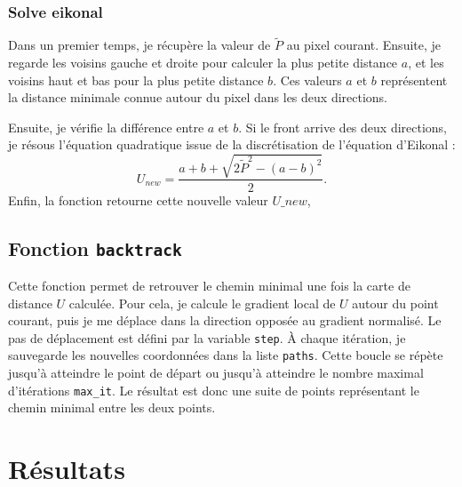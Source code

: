 \documentclass{article}
\begin{document}
\subsubsection{Solve eikonal}

Dans un premier temps, je récupère la valeur de $\tilde{P}$ au pixel courant.  
Ensuite, je regarde les voisins gauche et droite pour calculer la plus petite 
distance $a$, et les voisins haut et bas pour la plus petite distance $b$.  
Ces valeurs $a$ et $b$ représentent la distance minimale connue autour du pixel 
dans les deux directions.  

Ensuite, je vérifie la différence entre $a$ et $b$.  
Si le front arrive des deux directions, je résous l’équation quadratique issue 
de la discrétisation de l'équation d'Eikonal :  
\[
U_{new} = \frac{a + b + \sqrt{2 \tilde{P}^2 - (a - b)^2}}{2}.
\]
Enfin, la fonction retourne cette nouvelle valeur $U\_{new}$, 

\subsection{Fonction \texttt{backtrack}}

Cette fonction permet de retrouver le chemin minimal une fois la carte de distance 
$U$ calculée. Pour cela, je calcule le gradient local de $U$ autour du point courant, 
puis je me déplace dans la direction opposée au gradient normalisé.  
Le pas de déplacement est défini par la variable \texttt{step}.  
À chaque itération, je sauvegarde les nouvelles coordonnées dans la liste 
\texttt{paths}. Cette boucle se répète jusqu'à atteindre le point de départ 
ou jusqu'à atteindre le nombre maximal d'itérations \texttt{max\_it}.  
Le résultat est donc une suite de points représentant le chemin minimal entre les 
deux points.






\section{Résultats}
\end{document}
